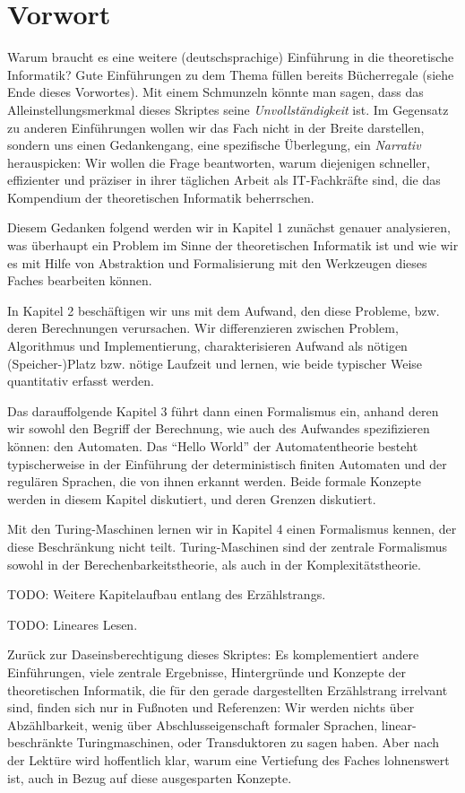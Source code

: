 \chapter{Vorwort}

Warum braucht es eine weitere (deutschsprachige) Einführung
in die theoretische Informatik?
Gute Einführungen zu dem Thema füllen bereits Bücherregale
(siehe Ende dieses Vorwortes).
Mit einem Schmunzeln könnte man sagen,
dass das Alleinstellungsmerkmal dieses Skriptes seine
\emph{Unvollständigkeit} ist.
Im Gegensatz zu anderen Einführungen wollen wir das Fach nicht in der Breite darstellen,
sondern uns einen Gedankengang, eine spezifische Überlegung,
ein \emph{Narrativ} herauspicken:
Wir wollen die Frage beantworten,
warum diejenigen
schneller, effizienter und präziser
in ihrer täglichen Arbeit als IT-Fachkräfte sind,
die das Kompendium der theoretischen Informatik beherrschen.

Diesem Gedanken folgend werden wir in Kapitel 1 zunächst genauer analysieren,
was überhaupt ein Problem im Sinne der theoretischen Informatik ist
und wie wir es mit Hilfe von Abstraktion und Formalisierung mit den Werkzeugen
dieses Faches bearbeiten können.

In Kapitel 2 beschäftigen wir uns mit dem Aufwand,
den diese Probleme, bzw. deren Berechnungen verursachen.
Wir differenzieren zwischen Problem, Algorithmus und Implementierung,
charakterisieren Aufwand als nötigen (Speicher-)Platz bzw. nötige Laufzeit 
und lernen, wie beide typischer Weise quantitativ erfasst werden.

Das darauffolgende Kapitel 3 führt dann einen Formalismus ein,
anhand deren wir sowohl den Begriff der Berechnung,
wie auch des Aufwandes spezifizieren können:
den Automaten.
Das ``Hello World'' der Automatentheorie besteht typischerweise 
in der Einführung der deterministisch finiten Automaten und der
regulären Sprachen, die von ihnen erkannt werden.
Beide formale Konzepte werden in diesem Kapitel diskutiert,
und deren Grenzen diskutiert.

Mit den Turing-Maschinen lernen wir in Kapitel 4 einen Formalismus kennen,
der diese Beschränkung nicht teilt.
Turing-Maschinen sind der zentrale Formalismus sowohl
in der Berechenbarkeitstheorie,
als auch in der Komplexitätstheorie.

TODO: Weitere Kapitelaufbau entlang des Erzählstrangs.

TODO: Lineares Lesen.

Zurück zur Daseinsberechtigung dieses Skriptes:
Es komplementiert andere Einführungen,
viele zentrale Ergebnisse, Hintergründe und Konzepte
der theoretischen Informatik,
die für den gerade dargestellten Erzählstrang irrelvant sind,
finden sich nur in Fußnoten und Referenzen:
Wir werden nichts über Abzählbarkeit,
wenig über Abschlusseigenschaft formaler Sprachen,
linear-beschränkte Turingmaschinen,
oder Transduktoren zu sagen haben.
Aber nach der Lektüre wird hoffentlich klar,
warum eine Vertiefung des Faches lohnenswert ist,
auch in Bezug auf diese ausgesparten Konzepte.

